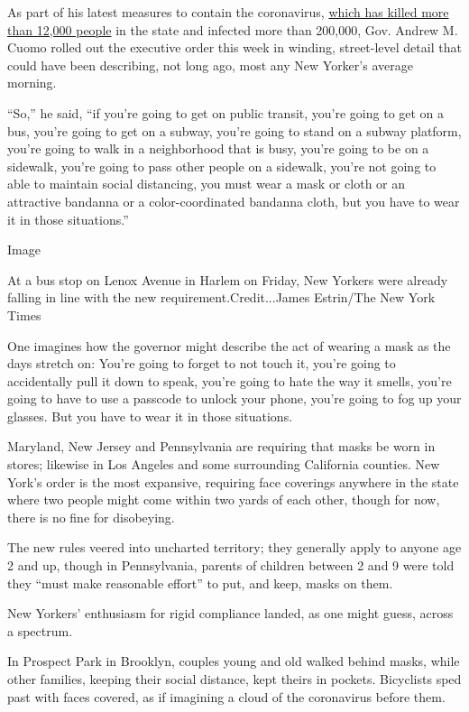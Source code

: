 As part of his latest measures to contain the coronavirus,
\href{https://www.nytimes3xbfgragh.onion/interactive/2020/us/new-york-coronavirus-cases.html}{which
has killed more than 12,000 people} in the state and infected more than
200,000, Gov. Andrew M. Cuomo rolled out the executive order this week
in winding, street-level detail that could have been describing, not
long ago, most any New Yorker's average morning.

``So,'' he said, ``if you're going to get on public transit, you're
going to get on a bus, you're going to get on a subway, you're going to
stand on a subway platform, you're going to walk in a neighborhood that
is busy, you're going to be on a sidewalk, you're going to pass other
people on a sidewalk, you're not going to able to maintain social
distancing, you must wear a mask or cloth or an attractive bandanna or a
color-coordinated bandanna cloth, but you have to wear it in those
situations.''

Image

At a bus stop on Lenox Avenue in Harlem on Friday, New Yorkers were
already falling in line with the new requirement.Credit...James
Estrin/The New York Times

One imagines how the governor might describe the act of wearing a mask
as the days stretch on: You're going to forget to not touch it, you're
going to accidentally pull it down to speak, you're going to hate the
way it smells, you're going to have to use a passcode to unlock your
phone, you're going to fog up your glasses. But you have to wear it in
those situations.

Maryland, New Jersey and Pennsylvania are requiring that masks be worn
in stores; likewise in Los Angeles and some surrounding California
counties. New York's order is the most expansive, requiring face
coverings anywhere in the state where two people might come within two
yards of each other, though for now, there is no fine for disobeying.

The new rules veered into uncharted territory; they generally apply to
anyone age 2 and up, though in Pennsylvania, parents of children between
2 and 9 were told they ``must make reasonable effort'' to put, and keep,
masks on them.

New Yorkers' enthusiasm for rigid compliance landed, as one might guess,
across a spectrum.

In Prospect Park in Brooklyn, couples young and old walked behind masks,
while other families, keeping their social distance, kept theirs in
pockets. Bicyclists sped past with faces covered, as if imagining a
cloud of the coronavirus before them.

